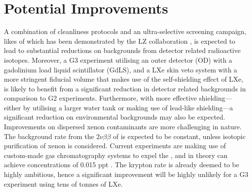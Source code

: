 \section{Potential Improvements}
\label{sec:g3_improvements}

A combination of cleanliness protocols and an ultra-selective screening campaign, likes of which has been demonstrated by the LZ collaboration \cite{lz_screening}, is expected to lead to substantial reductions on backgrounds from detector related radioactive isotopes. Moreover, a G3 experiment utilising an outer detector (OD) with a gadolinium load liquid scintillator (GdLS), and a LXe skin veto system with a more stringent fiducial volume that makes use of the self-shielding effect of LXe, is likely to benefit from a significant reduction in detector related backgrounds in comparison to G2 experiments. Furthermore, with more effective shielding---either by utilising a larger water tank or making use of lead-like shielding---a significant reduction on environmental backgrounds may also be expected. Improvements on dispersed xenon contaminants are more challenging in nature. The background rate from the $2\nu\beta\beta$ of \XeOTS{} is expected to be constant, unless isotopic purification of xenon is considered. Current experiments are making use of custom-made gas chromatography systems to expel the \KrEF{}, and in theory can achieve \KrEF{} concentrations of 0.015 ppt \cite{lz_tdr}. The krypton rate is already deemed to be highly ambitious, hence a significant improvement will be highly unlikely for a G3 experiment using tens of tonnes of LXe. 


